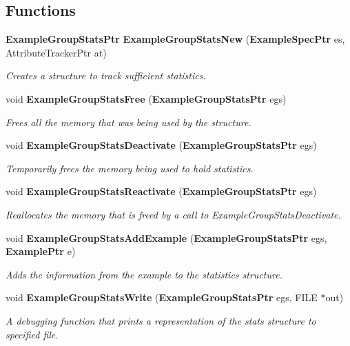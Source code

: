 \subsection*{Functions}
\begin{CompactItemize}
\item 
{\bf Example\-Group\-Stats\-Ptr} {\bf Example\-Group\-Stats\-New} ({\bf Example\-Spec\-Ptr} es, Attribute\-Tracker\-Ptr at)
\begin{CompactList}\small\item\em Creates a structure to track sufficient statistics. \item\end{CompactList}\item 
void {\bf Example\-Group\-Stats\-Free} ({\bf Example\-Group\-Stats\-Ptr} egs)
\begin{CompactList}\small\item\em Frees all the memory that was being used by the structure. \item\end{CompactList}\item 
void {\bf Example\-Group\-Stats\-Deactivate} ({\bf Example\-Group\-Stats\-Ptr} egs)
\begin{CompactList}\small\item\em Temporarily frees the memory being used to hold statistics. \item\end{CompactList}\item 
void {\bf Example\-Group\-Stats\-Reactivate} ({\bf Example\-Group\-Stats\-Ptr} egs)
\begin{CompactList}\small\item\em Reallocates the memory that is freed by a call to Example\-Group\-Stats\-Deactivate. \item\end{CompactList}\item 
void {\bf Example\-Group\-Stats\-Add\-Example} ({\bf Example\-Group\-Stats\-Ptr} egs, {\bf Example\-Ptr} e)
\begin{CompactList}\small\item\em Adds the information from the example to the statistics structure. \item\end{CompactList}\item 
void {\bf Example\-Group\-Stats\-Write} ({\bf Example\-Group\-Stats\-Ptr} egs, FILE $\ast$out)
\begin{CompactList}\small\item\em A debugging function that prints a representation of the stats structure to specified file. \item\end{CompactList}\item 

\end{CompactItemize}
